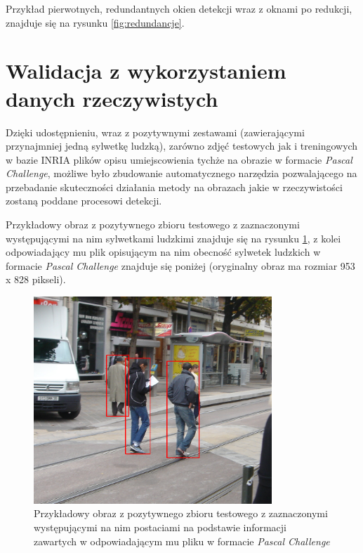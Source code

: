 Przykład pierwotnych, redundantnych okien detekcji wraz z oknami po redukcji, znajduje się na rysunku \ref{fig:redundancje}.

\section{Walidacja z wykorzystaniem danych rzeczywistych}
\label{sec:rzeczywiste}

Dzięki udostępnieniu, wraz z pozytywnymi zestawami (zawierającymi
przynajmniej jedną sylwetkę ludzką), zarówno zdjęć testowych jak i
treningowych w bazie INRIA plików opisu umiejscowienia tychże na
obrazie w formacie \textit{Pascal Challenge}, możliwe było zbudowanie
automatycznego narzędzia pozwalającego na przebadanie skuteczności
działania metody na obrazach jakie w rzeczywistości zostaną poddane
procesowi detekcji.

Przykładowy obraz z pozytywnego zbioru testowego z zaznaczonymi występującymi na nim sylwetkami ludzkimi znajduje się na rysunku \ref{fig:pascal}, z kolei odpowiadający mu plik
opisującym na nim obecność sylwetek ludzkich w formacie \textit{Pascal
Challenge} znajduje się poniżej (oryginalny obraz ma rozmiar 953 x 828
pikseli).

\begin{figure}[htb]
\centering
\includegraphics[width=0.8\textwidth]{ch4_pascal.png}
\caption{Przykładowy obraz z pozytywnego zbioru testowego z zaznaczonymi występującymi na nim postaciami na podstawie informacji zawartych w odpowiadającym mu pliku w formacie \textit{Pascal Challenge}}
\label{fig:pascal}
\end{figure}

